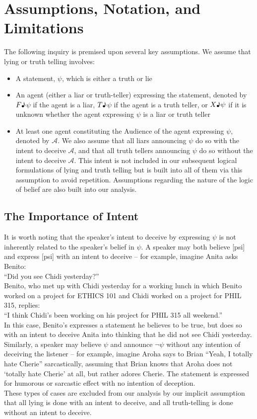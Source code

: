 \documentclass[12pt, titlepage, twoside, a4paper]{report}
\newcommand{\true}{$T\text{\textmusicalnote}$}
\newcommand{\false}{$F\text{\textmusicalnote}$}
\begin{document}
\section{Assumptions, Notation, and Limitations}
The following inquiry is premised upon several key assumptions. 
We assume that lying or truth telling involves: 
\begin{itemize}
\item A statement, $\psi$, which is either a truth or lie 
\item An agent (either a liar or truth-teller) expressing the statement, denoted by \false$\psi$ if the agent is a liar, \true$\psi$ if the agent is a truth teller, or $X \text{\textmusicalnote} \psi$ if it is unknown whether the agent expressing $\psi$ is a liar or truth teller 
\item At least one agent constituting the Audience of the agent expressing $\psi$, denoted by $\mathcal{A}$. We also assume that all liars announcing $\psi$ do so with the intent to deceive $\mathcal{A}$, and that all truth tellers announcing $\psi$ do so without the intent to deceive $\mathcal{A}$. This intent is not included in our subsequent logical formulations of lying and truth telling but is built into all of them via this assumption to avoid repetition. Assumptions regarding the nature of the logic of belief are also built into our analysis.
\end{itemize}

\subsection{The Importance of Intent}
It is worth noting that the speaker’s intent to deceive by expressing $\psi$ is not inherently related to the speaker’s belief in $\psi$. A speaker may both believe [psi] and express [psi] with an intent to deceive – for example, imagine Anita asks Benito:\\
 “Did you see Chidi yesterday?”\\
Benito, who met up with Chidi yesterday for a working lunch in which Benito worked on a project for ETHICS 101 and Chidi worked on a project for PHIL 315, replies:\\
 “I think Chidi’s been working on his project for PHIL 315 all weekend.”\\
 In this case, Benito’s expresses a statement he believes to be true, but does so with an intent to deceive Anita into thinking that he did not see Chidi yesterday.\\
Similarly, a speaker may believe $\psi$ and announce $\neg \psi$ without any intention of deceiving the listener – for example, imagine Aroha says to Brian “Yeah, I totally hate Cherie” sarcastically, assuming that Brian knows that Aroha does not ‘totally hate Cherie’ at all, but rather adores Cherie. The statement is expressed for humorous or sarcastic effect with no intention of deception.\\
These types of cases are excluded from our analysis by our implicit assumption that all lying is done with an intent to deceive, and all truth-telling is done without an intent to deceive.
\end{document}

